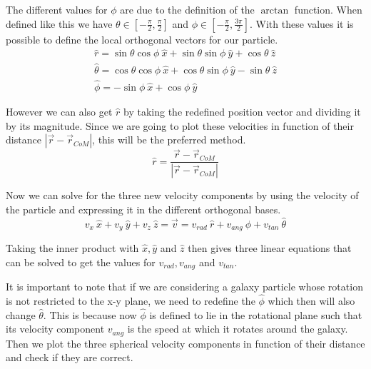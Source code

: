 \documentclass[a4paper,12pt, english]{article}
\begin{document}
\smallskip
The different values for $\phi$ are due to the definition of the \(\arctan\) function. When defined like this we have $\theta \in [-\frac{\pi}{2}, \frac{\pi}{2}]$ and $\phi \in [-\frac{\pi}{2}, \frac{3\pi}{2}]$. With these values it is possible to define the local orthogonal vectors for our particle. 
\begin{equation}
\begin{gathered}
\hat{r} = \sin\theta\cos\phi \ \hat{x} + \sin\theta\sin\phi \ \hat{y} + \cos\theta \ \hat{z} \\
\hat{\theta} = \cos\theta\cos\phi \ \hat{x} + \cos\theta\sin\phi \ \hat{y} - \sin\theta \ \hat{z} \\
\hat{\phi} = -\sin\phi \ \hat{x} + \cos\phi \ \hat{y}
\end{gathered}
\end{equation}\par
\smallskip
However we can also get $\hat{r}$ by taking the redefined position vector and dividing it by its magnitude. Since we are going to plot these velocities in function of their distance $|\vec{r}-\vec{r}_{CoM}|$, this will be the preferred method.  
\begin{equation}
    \hat{r} = \frac{\vec{r}-\vec{r}_{CoM}}{|\vec{r}-\vec{r}_{CoM}|}
\end{equation}\par
\smallskip
Now we can solve for the three new velocity components by using the velocity of the particle and expressing it in the different orthogonal bases.
\begin{equation}
    v_x \ \hat{x} + v_y \ \hat{y} + v_z \ \hat{z} = \vec{v} = v_{rad} \ \hat{r} + v_{ang} \ \hat{\phi} + v_{tan} \ \hat{\theta}
\end{equation}\par
\smallskip
Taking the inner product with $\hat{x}, \hat{y}$ and $\hat{z}$ then gives three linear equations that can be solved to get the values for $v_{rad}, v_{ang}$ and $v_{tan}$.\par
\smallskip
It is important to note that if we are considering a galaxy particle whose rotation is not restricted to the x-y plane, we need to redefine the $\hat{\phi}$ which then will also change $\hat{\theta}$. This is because now $\hat{\phi}$ is defined to lie in the rotational plane such that its velocity component $v_{ang}$ is the speed at which it rotates around the galaxy. Then we plot the three spherical velocity components in function of their distance and check if they are correct.\par
\end{document}
